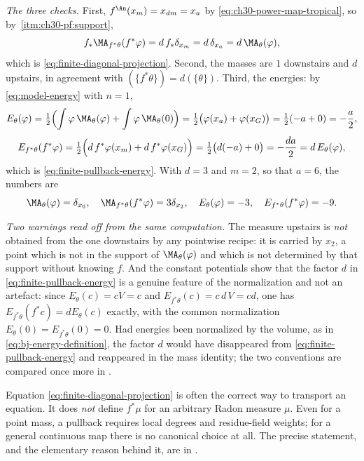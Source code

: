 \begin{example}
\emph{The three checks.}  First, \(f^{\An}(x_m)=x_{dm}=x_a\) by
\eqref{eq:ch30-power-map-tropical}, so by
\,\cref{itm:ch30-pf:support},
\[
 f_*\MA_{f^*\theta}(f^*\varphi)
 =d\,f_*\delta_{x_m}
 =d\,\delta_{x_a}
 =d\,\MA_\theta(\varphi),
\]
which is \eqref{eq:finite-diagonal-projection}.  Second, the masses are
\(1\) downstairs and \(d\) upstairs, in agreement with
\((\{f^*\theta\})=d(\{\theta\})\).  Third, the energies: by
\eqref{eq:model-energy} with \(n=1\),
\[
 E_\theta(\varphi)
 =\tfrac12\Bigl(\int\varphi\,\MA_\theta(\varphi)
    +\int\varphi\,\MA_\theta(0)\Bigr)
 =\tfrac12\bigl(\varphi(x_a)+\varphi(x_G)\bigr)
 =\tfrac12(-a+0)=-\frac a2 ,
\]
\[
 E_{f^*\theta}(f^*\varphi)
 =\tfrac12\Bigl(d\,f^*\varphi(x_m)+d\,f^*\varphi(x_G)\Bigr)
 =\tfrac12\bigl(d(-a)+0\bigr)=-\frac{da}2
 =d\,E_\theta(\varphi),
\]
which is \eqref{eq:finite-pullback-energy}.  With \(d=3\) and \(m=2\), so
that \(a=6\), the numbers are
\[
 \MA_\theta(\varphi)=\delta_{x_6},\quad
 \MA_{f^*\theta}(f^*\varphi)=3\delta_{x_2},\quad
 E_\theta(\varphi)=-3,\quad
 E_{f^*\theta}(f^*\varphi)=-9 .
\]

\emph{Two warnings read off from the same computation.}  The measure
upstairs is \emph{not} obtained from the one downstairs by any pointwise
recipe: it is carried by \(x_2\), a point which is not in the support of
\(\MA_\theta(\varphi)\) and which is not determined by that support without
knowing \(f\).  And the constant potentials show that the factor \(d\) in
\eqref{eq:finite-pullback-energy} is a genuine feature of the normalization
and not an artefact: since \(E_\theta(c)=cV=c\) and
\(E_{f^*\theta}(c)=c\,d\,V=cd\), one has
\(E_{f^*\theta}(f^*c)=dE_\theta(c)\) exactly, with the common normalization
\(E_\theta(0)=E_{f^*\theta}(0)=0\).  Had energies been normalized by the
volume, as in \eqref{eq:bj-energy-definition}, the factor \(d\) would have
disappeared from \eqref{eq:finite-pullback-energy} and reappeared in the
mass identity; the two conventions are compared once more in
.
\end{example}

Equation \eqref{eq:finite-diagonal-projection} is often the correct way to
transport an equation.  It does \emph{not} define \(f^*\mu\) for an
arbitrary Radon measure \(\mu\).  Even for a point mass, a pullback requires
local degrees and residue-field weights; for a general continuous map there
is no canonical choice at all.  The precise statement, and the elementary
reason behind it, are in .

